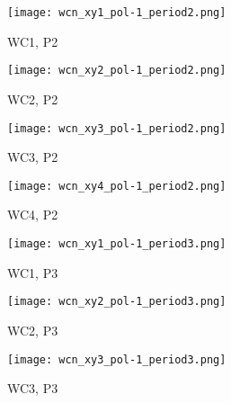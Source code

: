          \begin{figure}[h]	   
            \centering
   
               \begin{subfigure}[b]{0.23\textwidth}
            \centering
            \texttt{[image: wcn\_xy1\_pol-1\_period2.png]}
            \caption{WC1, P2}
            \label{fig_wc1_p2}
            \end{subfigure}
            \hfill             
             \begin{subfigure}[b]{0.23\textwidth}
            \centering
            \texttt{[image: wcn\_xy2\_pol-1\_period2.png]}
            \caption{WC2, P2}
            \label{fig_wc2_p2}
            \end{subfigure}
            \hfill 
              \begin{subfigure}[b]{0.23\textwidth}
            \centering
            \texttt{[image: wcn\_xy3\_pol-1\_period2.png]}
            \caption{WC3, P2}
            \label{fig_wc3_p2}
            \end{subfigure}
            \hfill    
             \begin{subfigure}[b]{0.23\textwidth}
            \centering
            \texttt{[image: wcn\_xy4\_pol-1\_period2.png]}
            \caption{WC4, P2}
            \label{fig_wc4_p2}
            \end{subfigure}
            \hfill
               \begin{subfigure}[b]{0.23\textwidth}
            \centering
            \texttt{[image: wcn\_xy1\_pol-1\_period3.png]}
            \caption{WC1, P3}
            \label{fig_wc1_p3}
            \end{subfigure}
            \hfill             
             \begin{subfigure}[b]{0.23\textwidth}
            \centering
            \texttt{[image: wcn\_xy2\_pol-1\_period3.png]}
            \caption{WC2, P3}
            \label{fig_wc2_p3}
            \end{subfigure}
            \hfill 
              \begin{subfigure}[b]{0.23\textwidth}
            \centering
            \texttt{[image: wcn\_xy3\_pol-1\_period3.png]}
            \caption{WC3, P3}
            \label{fig_wc3_p3}
            \end{subfigure}
            \hfill    
             \begin{subfigure}[b]{0.23\textwidth}

\end{subfigure}
\end{figure}
